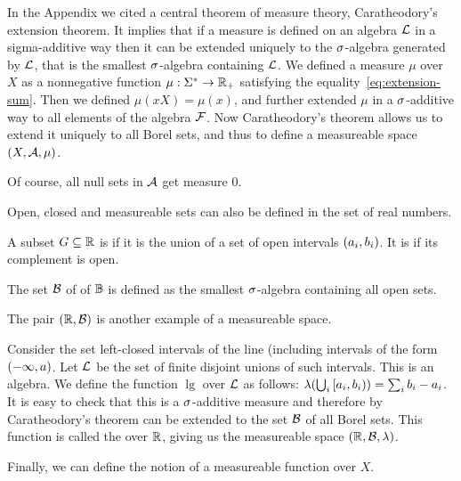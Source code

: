 In the Appendix we cited a central theorem of measure theory,
Caratheodory's extension theorem.
It implies that if a measure is defined on an algebra \( \mathcal{L} \) in a sigma-additive way
then it can be extended uniquely
to the \( \sigma \)-algebra generated by \( \mathcal{L} \), that is the
smallest \( \sigma \)-algebra containing \( \mathcal{L} \).
We defined a measure \( \mu \) over \( X \) as a nonnegative function
\( \mu:\Sigma^{*}\to\mathbb{R}_{+} \)
satisfying the equality~\eqref{eq:extension-sum}.
Then we defined \( \mu(xX)=\mu(x) \), and further
extended \( \mu \) in a \( \sigma \)-additive way to all elements of the algebra \( \mathcal{F} \).
Now Caratheodory's theorem allows us to extend it uniquely to all Borel sets,
and thus to define a measureable space \( (X,\mathcal{A},\mu) \).

Of course, all null sets in \( \mathcal{A} \) get measure 0.

Open,  closed and measureable sets can also be defined in the set of real numbers.

\begin{definition}
  \label{def:g2.3.16}
  \notready
  A subset \( G\subseteq\mathbb{R} \) is  if it is the union of a set of open
  intervals \( (a_{i},b_{i}) \).
It is  if its complement is open.

The set \( \mathcal{B} \) of  of \( \mathbb{B} \) is defined as the smallest
\( \sigma \)-algebra containing all open sets.
\end{definition}

The pair \( (\mathbb{R},\mathcal{B}) \) is another example of a measureable space.

\begin{definition}
  \label{def:g2.3.17}
  \notready
Consider the set left-closed intervals of the line (including intervals
of the form \( (-\infty,a) \).
Let \( \mathcal{L} \) be the set of finite disjoint unions of such intervals.
This is an algebra.
We define the function \( \lg \) over \( \mathcal{L} \) as follows:
\( \lambda(\bigcup_{i} \left[a_{i},b_{i}\right)) = \sum_{i} b_{i} - a_{i} \).
It is easy to check that this is a \( \sigma \)-additive measure and therefore by
Caratheodory's theorem can be extended to the set \( \mathcal{B} \) of all Borel sets.
This function is called the  over \( \mathbb{R} \), giving us the
measureable space \( (\mathbb{R},\mathcal{B},\lambda) \).
\end{definition}

Finally, we can define the notion of a measureable function over \( X \).

